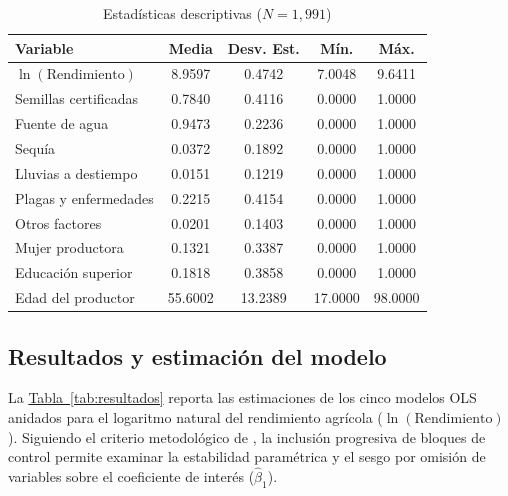 \documentclass[11pt,a4paper,twocolumn]{article}
\begin{document}
\begin{table}[ht!]
\raggedright
\scriptsize
\caption{Estadísticas descriptivas ($N=1,991$)}
\label{tab:descriptivas}
\begin{tabularx}{\columnwidth}{@{}Xcccc@{}}
\toprule
\textbf{Variable} & \textbf{Media} & \textbf{Desv. Est.} & \textbf{Mín.} & \textbf{Máx.} \\
\midrule
$\ln(\text{Rendimiento})$ & 8.9597 & 0.4742 & 7.0048 & 9.6411 \\
Semillas certificadas     & 0.7840 & 0.4116 & 0.0000 & 1.0000 \\
Fuente de agua            & 0.9473 & 0.2236 & 0.0000 & 1.0000 \\
Sequía                    & 0.0372 & 0.1892 & 0.0000 & 1.0000 \\
Lluvias a destiempo       & 0.0151 & 0.1219 & 0.0000 & 1.0000 \\
Plagas y enfermedades     & 0.2215 & 0.4154 & 0.0000 & 1.0000 \\
Otros factores            & 0.0201 & 0.1403 & 0.0000 & 1.0000 \\
Mujer productora          & 0.1321 & 0.3387 & 0.0000 & 1.0000 \\
Educación superior        & 0.1818 & 0.3858 & 0.0000 & 1.0000 \\
Edad del productor        & 55.6002 & 13.2389 & 17.0000 & 98.0000 \\
\bottomrule
\end{tabularx}
\vspace{2pt}\par{}
\end{table}

\subsection{Resultados y estimación del modelo}
La \hyperref[tab:resultados]{Tabla~\ref*{tab:resultados}} reporta las estimaciones de los cinco modelos OLS anidados para el logaritmo natural del rendimiento agrícola ($\ln(\text{Rendimiento})$). Siguiendo el criterio metodológico de \citet{wooldridge}, la inclusión progresiva de bloques de control permite examinar la estabilidad paramétrica y el sesgo por omisión de variables sobre el coeficiente de interés ($\hat{\beta}_1$).
\end{document}
